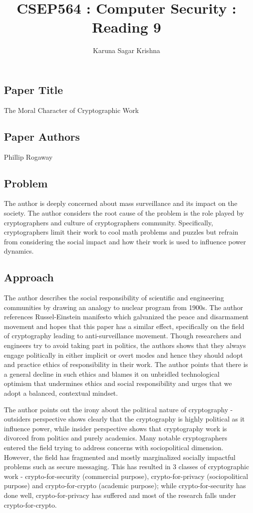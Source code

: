 \documentclass[12pt]{article}
\title{CSEP564 : Computer Security : Reading 9}
\author{Karuna Sagar Krishna}
\begin{document}
    \maketitle

    \subsection*{Paper Title}
    The Moral Character of Cryptographic Work

    \subsection*{Paper Authors}
    Phillip Rogaway

    \subsection*{Problem}
    The author is deeply concerned about mass surveillance and its impact on the society. The author considers the root cause of the problem is the role played by cryptographers and culture of cryptographers community. Specifically, cryptographers limit their work to cool math problems and puzzles but refrain from considering the social impact and how their work is used to influence power dynamics.

    \subsection*{Approach}
    The author describes the social responsibility of scientific and engineering communities by drawing an analogy to nuclear program from 1900s. The author references Russel-Einstein manifesto which galvanized the peace and disarmament movement and hopes that this paper has a similar effect, specifically on the field of cryptography leading to anti-surveillance movement. Though researchers and engineers try to avoid taking part in politics, the authors shows that they always engage politically in either implicit or overt modes and hence they should adopt and practice ethics of responsibility in their work. The author points that there is a general decline in such ethics and blames it on unbridled technological optimism that undermines ethics and social responsibility and urges that we adopt a balanced, contextual mindset.

    The author points out the irony about the political nature of cryptography - outsiders perspective shows clearly that the cryptography is highly political as it influence power, while insider perspective shows that cryptography work is divorced from politics and purely academics. Many notable cryptographers entered the field trying to address concerns with sociopolitical dimension. However, the field has fragmented and mostly marginalized socially impactful problems such as secure messaging. This has resulted in 3 classes of cryptographic work - crypto-for-security (commercial purpose), crypto-for-privacy (sociopolitical purpose) and crypto-for-crypto (academic purpose); while crypto-for-security has done well, crypto-for-privacy has suffered and most of the research falls under crypto-for-crypto.
\end{document}
